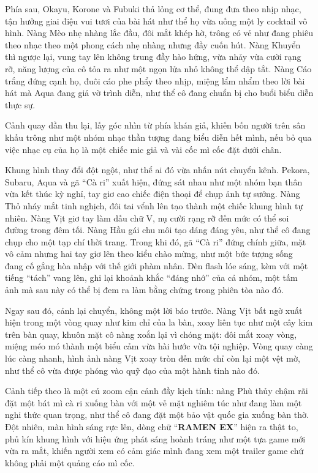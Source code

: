 \documentclass[../main.tex]{subfiles}
\begin{document}
Phía sau, Okayu, Korone và Fubuki thả lỏng cơ thể, đung đưa theo nhịp nhạc, tận hưởng giai điệu vui tươi của bài hát như thể họ vừa uống một ly cocktail vô hình. Nàng Mèo nhẹ nhàng lắc đầu, đôi mắt khép hờ, trông có vẻ như đang phiêu theo nhạc theo một phong cách nhẹ nhàng nhưng đầy cuốn hút. Nàng Khuyển thì ngược lại, vung tay lên không trung đầy hào hứng, vừa nhảy vừa cười rạng rỡ, năng lượng của cô tỏa ra như một ngọn lửa nhỏ không thể dập tắt. Nàng Cáo trắng đứng cạnh họ, đuôi cáo phe phẩy theo nhịp, miệng lẩm nhẩm theo lời bài hát mà Aqua đang giả vờ trình diễn, như thể cô đang chuẩn bị cho buổi biểu diễn thực sự.

Cảnh quay dần thu lại, lấy góc nhìn từ phía khán giả, khiến bốn người trên sân khấu trông như một nhóm nhạc thần tượng đang biểu diễn hết mình, nếu bỏ qua việc nhạc cụ của họ là một chiếc mic giả và vài cốc mì cốc đặt dưới chân.

\ct


Khung hình thay đổi đột ngột, như thể ai đó vừa nhấn nút chuyển kênh. Pekora, Subaru, Aqua và gã ``Cà ri'' xuất hiện, đứng sát nhau như một nhóm bạn thân vừa kết thúc kỳ nghỉ, tay giơ cao chiếc điện thoại để chụp ảnh tự sướng. Nàng Thỏ nháy mắt tinh nghịch, đôi tai vểnh lên tạo thành một chiếc khung hình tự nhiên. Nàng Vịt giơ tay làm dấu chữ V, nụ cười rạng rỡ đến mức có thể soi đường trong đêm tối. Nàng Hầu gái chu môi tạo dáng đáng yêu, như thể cô đang chụp cho một tạp chí thời trang. Trong khi đó, gã ``Cà ri'' đứng chính giữa, mặt vô cảm nhưng hai tay giơ lên theo kiểu chào mừng, như một bức tượng sống đang cố gắng hòa nhập với thế giới phàm nhân. Đèn flash lóe sáng, kèm với một tiếng ``tách'' vang lên, ghi lại khoảnh khắc ``đáng nhớ'' của cả nhóm, một tấm ảnh mà sau này có thể bị đem ra làm bằng chứng trong phiên tòa nào đó.

Ngay sau đó, cảnh lại chuyển, không một lời báo trước. Nàng Vịt bất ngờ xuất hiện trong một vòng quay như kim chỉ của la bàn, xoay liên tục như một cây kim trên bàn quay, khuôn mặt cô nàng xoắn lại vì chóng mặt: đôi mắt xoay vòng, miệng méo mó thành một biểu cảm vừa hài hước vừa tội nghiệp. Vòng quay càng lúc càng nhanh, hình ảnh nàng Vịt xoay tròn đến mức chỉ còn lại một vệt mờ, như thể cô vừa được phóng vào quỹ đạo của một hành tinh nào đó.

Cảnh tiếp theo là một cú zoom cận cảnh đầy kịch tính: nàng Phù thủy chậm rãi đặt một bát mì cà ri xuống bàn với một vẻ mặt nghiêm túc như đang làm một nghi thức quan trọng, như thể cô đang đặt một bảo vật quốc gia xuống bàn thờ. Đột nhiên, màn hình sáng rực lên, dòng chữ ``\textbf{RAMEN EX}'' hiện ra thật to, phủ kín khung hình với hiệu ứng phát sáng hoành tráng như một tựa game mới vừa ra mắt, khiến người xem có cảm giác mình đang xem một trailer game chứ không phải một quảng cáo mì cốc.
\end{document}
